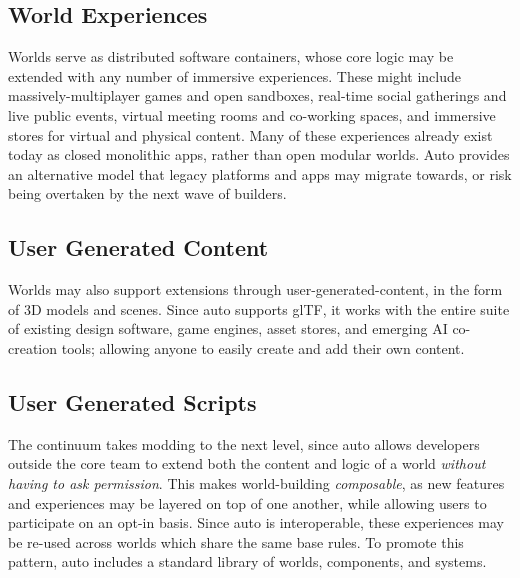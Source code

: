 \documentclass[twocolumn, 10pt]{article}
\begin{document}
\subsection{World Experiences}

Worlds serve as distributed software containers, whose core logic may be extended with any number of immersive experiences. These might include massively-multiplayer games and open sandboxes, real-time social gatherings and live public events, virtual meeting rooms and co-working spaces, and immersive stores for virtual and physical content. Many of these experiences already exist today as closed monolithic apps, rather than open modular worlds. Auto provides an alternative model that legacy platforms and apps may migrate towards, or risk being overtaken by the next wave of builders.

\subsection{User Generated Content}

Worlds may also support extensions through user-generated-content, in the form of 3D models and scenes. Since auto supports glTF, it works with the entire suite of existing design software, game engines, asset stores, and emerging AI co-creation tools; allowing anyone to easily create and add their own content. 

\subsection{User Generated Scripts}

The continuum takes modding to the next level, since auto allows developers outside the core team to extend both the content and logic of a world \textit{without having to ask permission}. This makes world-building \textit{composable}, as new features and experiences may be layered on top of one another, while allowing users to participate on an opt-in basis. Since auto is interoperable, these experiences may be re-used across worlds which share the same base rules. To promote this pattern, auto includes a standard library of worlds, components, and systems. 
\end{document}
